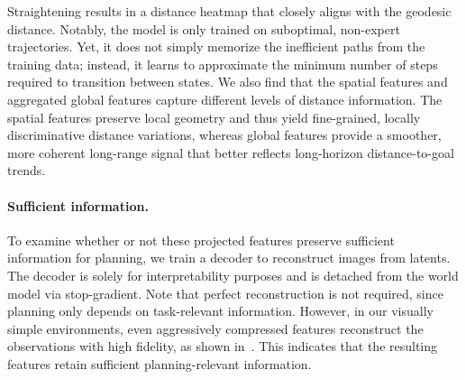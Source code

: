Straightening results in a distance heatmap that closely aligns with the geodesic distance. Notably, the model is only trained on suboptimal, non-expert trajectories. Yet, it does not simply memorize the inefficient paths from the training data; instead, it learns to approximate the minimum number of steps required to transition between states. We also find that the spatial features and aggregated global features capture different levels of distance information. The spatial features preserve local geometry and thus yield fine-grained, locally discriminative distance variations, whereas global features provide a smoother, more coherent long-range signal that better reflects long-horizon distance-to-goal trends.

\vspace{-0.1in}
\paragraph{Sufficient information.} To examine whether or not these projected features preserve sufficient information for planning, we train a decoder to reconstruct images from latents. The decoder is solely for interpretability purposes and is detached from the world model via stop-gradient. Note that perfect reconstruction is not required, since planning only depends on task-relevant information. However, in our visually simple environments, even aggressively compressed features reconstruct the observations with high fidelity, as shown in~. This indicates that the resulting features retain sufficient planning-relevant information.

